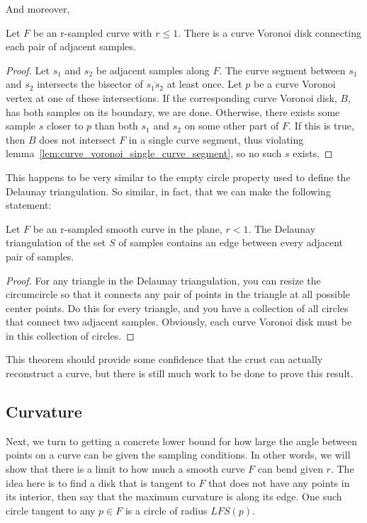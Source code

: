 And moreover,

\begin{lemma}
	Let $F$ be an r-sampled curve with $r \le 1$. There is a curve Voronoi disk connecting each pair of adjacent samples.
	\label{lem:cruve_voronoi_disk_connects}
\end{lemma}

\begin{proof}
	Let $s_1$ and $s_2$ be adjacent samples along $F$.
	The curve segment between $s_1$ and $s_2$ intersects the bisector of $\overline{s_1s_2}$ at least once.
	Let $p$ be a curve Voronoi vertex at one of these intersections.
	If the corresponding curve Voronoi disk, $B$, has both samples on its boundary, we are done.
	Otherwise, there exists some sample $s$ closer to $p$ than both $s_1$ and $s_2$ on some other part of $F$.
	If this is true, then $B$ does not intersect $F$ in a single curve segment, thus violating lemma~\ref{lem:curve_voronoi_single_curve_segment}, so no such $s$ exists.
\end{proof}

This happens to be very similar to the empty circle property used to define the Delaunay triangulation.
So similar, in fact, that we can make the following statement:

\begin{theorem}
	Let $F$ be an r-sampled smooth curve in the plane, $r < 1$.
	The Delaunay triangulation of the set $S$ of samples contains an edge between every adjacent pair of samples.
\end{theorem}

\begin{proof}
	For any triangle in the Delaunay triangulation, you can resize the circumcircle so that it connects any pair of points in the triangle at all possible center points.
	Do this for every triangle, and you have a collection of all circles that connect two adjacent samples.
	Obviously, each curve Voronoi disk must be in this collection of circles.
\end{proof}

This theorem should provide some confidence that the crust can actually reconstruct a curve, but there is still much work to be done to prove this result.

\subsection{Curvature}

Next, we turn to getting a concrete lower bound for how large the angle between points on a curve can be given the sampling conditions.
In other words, we will show that there is a limit to how much a smooth curve $F$ can bend given $r$.
The idea here is to find a disk that is tangent to $F$ that does not have any points in its interior, then say that the maximum curvature is along its edge.
One such circle tangent to any $p\in F$ is a circle of radius $LFS(p)$.

